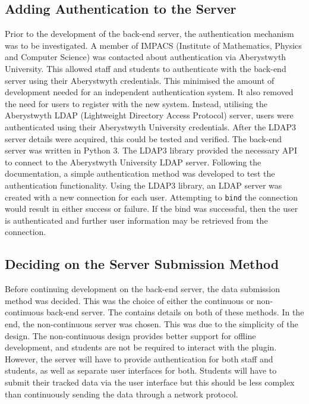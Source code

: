 \subsection{Adding Authentication to the Server}
Prior to the development of the back-end server, the authentication mechanism was to be investigated. A member of IMPACS (Institute of Mathematics, Physics and Computer Science) was contacted about authentication via Aberystwyth University. This allowed staff and students to authenticate with the back-end server using their Aberystwyth credentials. This minimised the amount of development needed for an independent authentication system. It also removed the need for users to register with the new system. Instead, utilising the Aberystwyth LDAP (Lightweight Directory Access Protocol) server, users were authenticated using their Aberystwyth University credentials. After the LDAP3 server details were acquired, this could be tested and verified. The back-end server was written in Python 3. The LDAP3 library provided the necessary API to connect to the Aberystwyth University LDAP server\cite{LDAP3Docs}. Following the documentation, a simple authentication method was developed to test the authentication functionality. Using the LDAP3 library, an LDAP server was created with a new connection for each user. Attempting to \texttt{bind} the connection would result in either success or failure. If the bind was successful, then the user is authenticated and further user information may be retrieved from the connection.

\subsection{Deciding on the Server Submission Method}
Before continuing development on the back-end server, the data submission method was decided. This was the choice of either the continuous or non-continuous back-end server. The  contains details on both of these methods. In the end, the non-continuous server was chosen. This was due to the simplicity of the design. The non-continuous design provides better support for offline development, and students are not be required to interact with the plugin. However, the server will have to provide authentication for both staff and students, as well as separate user interfaces for both. Students will have to submit their tracked data via the user interface but this should be less complex than continuously sending the data through a network protocol.

